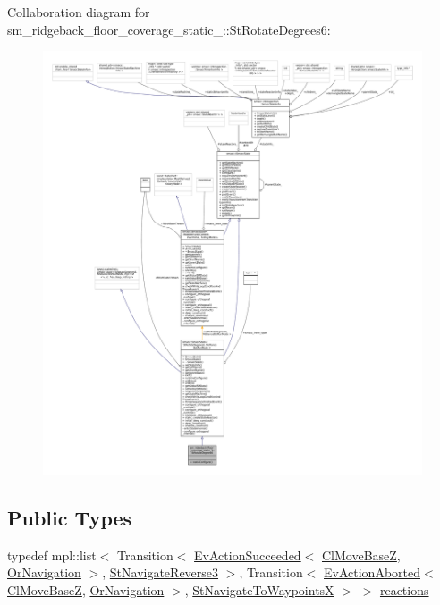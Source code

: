 Collaboration diagram for sm\+\_\+ridgeback\+\_\+floor\+\_\+coverage\+\_\+static\+\_\+:\+:St\+Rotate\+Degrees6\+:
\nopagebreak
\begin{figure}[H]
\begin{center}
\leavevmode
\includegraphics[width=350pt]{structsm__ridgeback__floor__coverage__static__1_1_1StRotateDegrees6__coll__graph}
\end{center}
\end{figure}
\subsection*{Public Types}
\begin{DoxyCompactItemize}
\item 
typedef mpl\+::list$<$ Transition$<$ \hyperlink{structsmacc_1_1default__events_1_1EvActionSucceeded}{Ev\+Action\+Succeeded}$<$ \hyperlink{classcl__move__base__z_1_1ClMoveBaseZ}{Cl\+Move\+BaseZ}, \hyperlink{classsm__ridgeback__floor__coverage__static__1_1_1OrNavigation}{Or\+Navigation} $>$, \hyperlink{structsm__ridgeback__floor__coverage__static__1_1_1StNavigateReverse3}{St\+Navigate\+Reverse3} $>$, Transition$<$ \hyperlink{structsmacc_1_1default__events_1_1EvActionAborted}{Ev\+Action\+Aborted}$<$ \hyperlink{classcl__move__base__z_1_1ClMoveBaseZ}{Cl\+Move\+BaseZ}, \hyperlink{classsm__ridgeback__floor__coverage__static__1_1_1OrNavigation}{Or\+Navigation} $>$, \hyperlink{structsm__ridgeback__floor__coverage__static__1_1_1StNavigateToWaypointsX}{St\+Navigate\+To\+WaypointsX} $>$ $>$ \hyperlink{structsm__ridgeback__floor__coverage__static__1_1_1StRotateDegrees6_a1babbb0b73ffae64e466e28fddbde49d}{reactions}
\end{DoxyCompactItemize}
